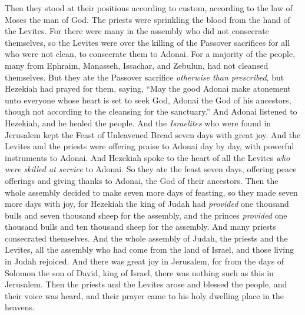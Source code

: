 \begin{biblechapter}
\verse Then they stood at their positions according to custom, according to the law of Moses the man of God. The priests were sprinkling the blood from the hand of the Levites.
\verse For there were many in the assembly who did not consecrate themselves, so the Levites were over the killing of the Passover sacrifices for all who were not clean, to consecrate them to Adonai.
\verse For a majority of the people, many from Ephraim, Manasseh, Issachar, and Zebulun, had not cleansed themselves. But they ate the Passover sacrifice \textit{otherwise than prescribed}, but Hezekiah had prayed for them, saying, “May the good Adonai make atonement unto
\verse everyone whose heart is set to seek God, Adonai the God of his ancestors, though not according to the cleansing for the sanctuary.”
\verse And Adonai listened to Hezekiah, and he healed the people.
\verse And the \textit{Israelites} who were found in Jerusalem kept the Feast of Unleavened Bread seven days with great joy. And the Levites and the priests were offering praise to Adonai day by day, with powerful instruments to Adonai.
\verse And Hezekiah spoke to the heart of all the Levites \textit{who were skilled at service} to Adonai. So they ate the feast seven days, offering peace offerings and giving thanks to Adonai, the God of their ancestors.
\verse Then the whole assembly decided to make seven more days of feasting, so they made seven more days with joy,
\verse for Hezekiah the king of Judah had \textit{provided} one thousand bulls and seven thousand sheep for the assembly, and the princes \textit{provided} one thousand bulls and ten thousand sheep for the assembly. And many priests consecrated themselves.
\verse And the whole assembly of Judah, the priests and the Levites, all the assembly who had come from the land of Israel, and those living in Judah rejoiced.
\verse And there was great joy in Jerusalem, for from the days of Solomon the son of David, king of Israel, there was nothing such as this in Jerusalem.
\verse Then the priests and the Levites arose and blessed the people, and their voice was heard, and their prayer came to his holy dwelling place in the heavens.
\end{biblechapter}

